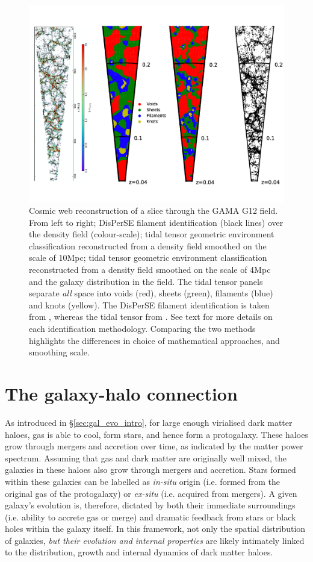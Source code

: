 \begin{figure}
    \centering
	\includegraphics[width=\linewidth]{thesis/latex/introduction/disperse_tt_comparison_gama.pdf}
    \caption{Cosmic web reconstruction of a slice through the GAMA G12 field. From left to right; DisPerSE filament identification (black lines) over the density field (colour-scale); tidal tensor geometric environment classification reconstructed from a density field smoothed on the scale of 10Mpc; tidal tensor geometric environment classification reconstructed from a density field smoothed on the scale of 4Mpc and the galaxy distribution in the field. The tidal tensor panels separate \textit{all} space into voids (red), sheets (green), filaments (blue) and knots (yellow). The DisPerSE filament identification is taken from \citet{kraljic2018}, whereas the tidal tensor from \citet{eardley2015}. See text for more details on each identification methodology. Comparing the two methods highlights the differences in choice of mathematical approaches, and smoothing scale.}
    \label{fig:disperse_tt_comparison}
\end{figure}

\section{The galaxy-halo connection}
As introduced in \S\ref{sec:gal_evo_intro}, for large enough virialised dark matter haloes, gas is able to cool, form stars, and hence form a protogalaxy. These haloes grow through mergers and accretion over time, as indicated by the matter power spectrum. Assuming that gas and dark matter are originally well mixed, the galaxies in these haloes also grow through mergers and accretion. Stars formed within these galaxies can be labelled as \textit{in-situ} origin (i.e. formed from the original gas of the protogalaxy) or \textit{ex-situ} (i.e. acquired from mergers). A given galaxy's evolution is, therefore, dictated by both their immediate surroundings (i.e. ability to accrete gas or merge) and dramatic feedback from stars or black holes within the galaxy itself. In this framework, not only the spatial distribution of galaxies, \textit{but their evolution and internal properties} are likely intimately linked to the distribution, growth and internal dynamics of dark matter haloes. 

